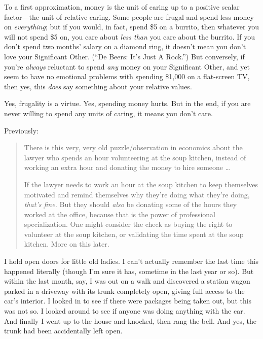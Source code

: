 {
 To a first approximation, money is the unit of caring up to a
positive scalar factor---the unit of relative caring. Some people are
frugal and spend less money on \textit{everything}; but if you would,
in fact, spend \$5 on a burrito, then whatever you will not spend \$5
on, you care about \textit{less than} you care about the burrito. If
you don't spend two months' salary on a
diamond ring, it doesn't mean you don't
love your Significant Other. (``De Beers:
It's Just A Rock.'') But conversely,
if you're \textit{always} reluctant to spend
\textit{any} money on your Significant Other, and yet seem to have no
emotional problems with spending \$1,000 on a flat-screen TV, then yes,
this \textit{does} say something about your relative values.}

{
 Yes, frugality is a virtue. Yes, spending money hurts. But in the
end, if you are never willing to spend any units of caring, it means
you don't care.}

\myendsectiontext


{
 Previously:}

\begin{quotation}
{
 There is this very, very old puzzle/observation in economics about
the lawyer who spends an hour volunteering at the soup kitchen, instead
of working an extra hour and donating the money to hire someone \ldots}

{
 If the lawyer needs to work an hour at the soup kitchen to keep
themselves motivated and remind themselves why they're
doing what they're doing,
\textit{that's fine.} But they should \textit{also} be
donating some of the hours they worked at the office, because that is
the power of professional specialization. One might consider the check
as buying the right to volunteer at the soup kitchen, or validating the
time spent at the soup kitchen. More on this later.}
\end{quotation}

{
 I hold open doors for little old ladies. I can't
actually remember the last time this happened literally (though
I'm sure it has, sometime in the last year or so). But
within the last month, say, I was out on a walk and discovered a
station wagon parked in a driveway with its trunk completely open,
giving full access to the car's interior. I looked in
to see if there were packages being taken out, but this was not so. I
looked around to see if anyone was doing anything with the car. And
finally I went up to the house and knocked, then rang the bell. And
yes, the trunk had been accidentally left open.}

